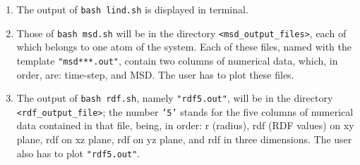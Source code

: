 \documentclass[11pt]{article}
\begin{document}
\begin{enumerate}
\item The output of {\texttt{bash lind.sh}} is displayed in terminal.
\item Those of {\texttt{bash msd.sh}} will be in the directory {\texttt{<msd\_output\_files>}}, each of which belongs to one atom of the system. Each of these files, named with the template {\texttt{"msd***.out"}}, contain two columns of numerical data, which, in order, are: time-step, and MSD. The user has to plot these files.
\item The output of {\texttt{bash rdf.sh}}, namely {\texttt{"rdf5.out"}}, will be in the directory {\texttt{<rdf\_output\_file>}}; the number {\texttt{'5'}} stands for the five columns of numerical data contained in that file, being, in order: r (radius), rdf (RDF values) on xy plane, rdf on xz plane, rdf on yz plane, and rdf in three dimensions. The user also has to plot {\texttt{"rdf5.out"}}.
\end{enumerate}
\end{document}
